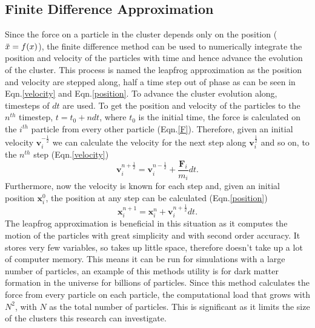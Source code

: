 \documentclass{article}
\begin{document}
\begin{multicols}{2}
\subsection{Finite Difference Approximation}
Since the force on a particle in the cluster depends only on the position ($\Ddot{x}=f(x)$), the finite difference method can be used to numerically integrate the position and velocity of the particles with time and hence advance the evolution of the cluster. This process is named the leapfrog approximation as the position and velocity are stepped along, half a time step out of phase as can be seen in Eqn.\ref{velocity} and Eqn.\ref{position}. To advance the cluster evolution along, timesteps of $dt$ are used. To get the position and velocity of the particles to the $n^{th}$ timestep, $t=t_0+ndt$, where $t_0$ is the initial time, the force is calculated on the $i^{th}$ particle from every other particle (Eqn.\ref{F}). Therefore, given an initial velocity $\textbf{v}_{i}^{-\frac{1}{2}}$ we can calculate the velocity for the next step along $\textbf{v}_{i}^{\frac{1}{2}}$ and so on, to the $n^{th}$ step (Eqn.\ref{velocity})
\begin{equation}
    \textbf{v}_{i}^{n+\frac{1}{2}} = \textbf{v}_{i}^{n-\frac{1}{2}} + \frac{\textbf{F}_i}{m_i}dt.
    \label{velocity}
\end{equation}
 Furthermore, now the velocity is known for each step and, given an initial position $\textbf{x}_{i}^{0}$, the position at any step can be calculated (Eqn.\ref{position})
\begin{equation}
    \textbf{x}_{i}^{n+1} = \textbf{x}_{i}^{n} + \textbf{v}_{i}^{n+\frac{1}{2}}dt.
    \label{position}
\end{equation}
The leapfrog approximation is beneficial in this situation as it computes the motion of the particles with great simplicity and with second order accuracy. It stores very few variables, so takes up little space, therefore doesn't take up a lot of computer memory. This means it can be run for simulations with a large number of particles, an example of this methods utility is for dark matter formation in the universe for billions of particles. Since this method calculates the force from every particle on each particle, the computational load that grows with $N^2$, with $N$ as the total number of particles. This is significant as it limits the size of the clusters this research can investigate.


\end{multicols}
\end{document}
